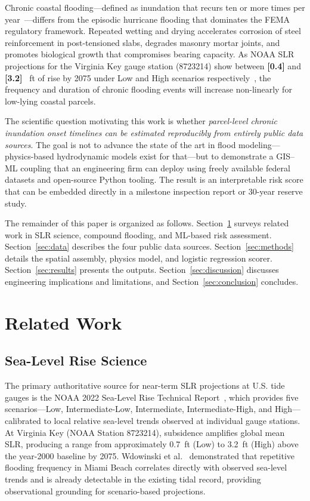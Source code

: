 \documentclass[conference]{IEEEtran}
\newcommand{\placeholder}[1]{%
  \colorbox{yellow!60}{\textbf{[#1]}}%
}
\begin{document}
Chronic coastal flooding—defined as inundation that recurs ten or more
times per year~\cite{moftakhari2017}—differs from the episodic hurricane
flooding that dominates the FEMA regulatory framework.
Repeated wetting and drying accelerates corrosion of steel reinforcement
in post-tensioned slabs, degrades masonry mortar joints, and promotes
biological growth that compromises bearing capacity.
As NOAA SLR projections for the Virginia Key gauge station (8723214)
show between \placeholder{0.4} and \placeholder{3.2}~ft of rise by
2075 under Low and High scenarios respectively~\cite{sweet2022}, the
frequency and duration of chronic flooding events will increase
non-linearly for low-lying coastal parcels.

The scientific question motivating this work is whether
\textit{parcel-level chronic inundation onset timelines can be estimated
reproducibly from entirely public data sources}.
The goal is not to advance the state of the art in flood modeling—
physics-based hydrodynamic models exist for that—but to demonstrate
a GIS--ML coupling that an engineering firm can deploy using freely
available federal datasets and open-source Python tooling.
The result is an interpretable risk score that can be embedded directly
in a milestone inspection report or 30-year reserve study.

The remainder of this paper is organized as follows.
Section~\ref{sec:related} surveys related work in SLR science, compound
flooding, and ML-based risk assessment.
Section~\ref{sec:data} describes the four public data sources.
Section~\ref{sec:methods} details the spatial assembly, physics model,
and logistic regression scorer.
Section~\ref{sec:results} presents the outputs.
Section~\ref{sec:discussion} discusses engineering implications and
limitations, and Section~\ref{sec:conclusion} concludes.


\section{Related Work}
\label{sec:related}

\subsection*{Sea-Level Rise Science}

The primary authoritative source for near-term SLR projections at U.S.
tide gauges is the NOAA 2022 Sea-Level Rise Technical Report~\cite{sweet2022},
which provides five scenarios—Low, Intermediate-Low, Intermediate,
Intermediate-High, and High—calibrated to local relative sea-level trends
observed at individual gauge stations.
At Virginia Key (NOAA Station 8723214), subsidence amplifies global
mean SLR, producing a range from approximately 0.7~ft (Low) to
3.2~ft (High) above the year-2000 baseline by 2075.
Wdowinski et al.~\cite{wdowinski2016} demonstrated that repetitive
flooding frequency in Miami Beach correlates directly with observed
sea-level trends and is already detectable in the existing tidal record,
providing observational grounding for scenario-based projections.
\end{document}
